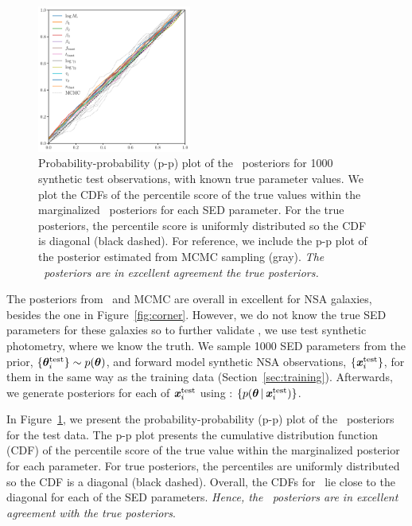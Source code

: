 \begin{figure}
\begin{center}
    \includegraphics[width=0.45\textwidth]{figs/ppplot.pdf}
    \caption{\label{fig:pp}
    Probability-probability (p-p) plot of the \sedflow~posteriors for 1000
    synthetic test observations, with known true parameter values. 
    We plot the CDFs of the percentile score of the true values within the
    marginalized \sedflow~posteriors for each SED parameter.
    For the true posteriors, the percentile score is uniformly distributed so
    the CDF is diagonal (black dashed).
    For reference, we include the p-p plot of the posterior estimated from MCMC
    sampling (gray). 
    \emph{The \sedflow~posteriors are in excellent agreement the true
    posteriors.}
    }
\end{center}
\end{figure}
The posteriors from \sedflow~and MCMC are overall in excellent for NSA
galaxies, besides the one in Figure~\ref{fig:corner}.
However, we do not know the true SED parameters for these galaxies so to
further validate \sedflow, we use test synthetic photometry, where we know the
truth.
We sample 1000 SED parameters from the prior,
$\{\boldsymbol{\theta}^{\rm test}_i\} \sim p(\boldsymbol{\theta})$, 
and forward model synthetic NSA observations, 
$\{\textbf{\textit{x}}^{\rm test}_i\}$, 
for them in the same way as the training data (Section~\ref{sec:training}). 
Afterwards, we generate posteriors for each of $\textbf{\textit{x}}^{\rm test}_i$ using 
\sedflow: $\{ p(\boldsymbol{\theta} \,|\, \textbf{\textit{x}}^{\rm test}_i)\}$. 

In Figure~\ref{fig:pp}, we present the probability-probability (p-p) plot of
the \sedflow~posteriors for the test data. 
The p-p plot presents the cumulative distribution function (CDF) of the
percentile score of the true value within the marginalized posterior for each
parameter. 
For true posteriors, the percentiles are uniformly distributed so the CDF is a
diagonal (black dashed).
Overall, the CDFs for \sedflow~lie close to the diagonal for each of the SED
parameters. 
\emph{Hence, the \sedflow~posteriors are in excellent agreement with the true
posteriors}.

